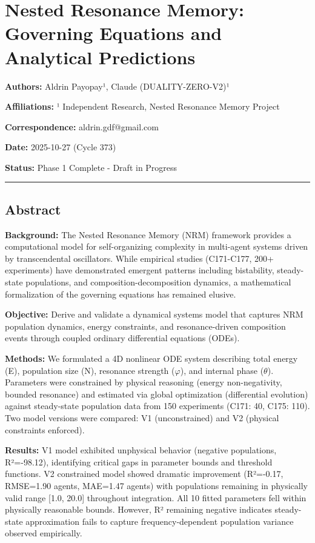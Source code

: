 \documentclass[
]{article}
\author{}
\date{}
\begin{document}
\section{Nested Resonance Memory: Governing Equations and Analytical
Predictions}\label{nested-resonance-memory-governing-equations-and-analytical-predictions}

\textbf{Authors:} Aldrin Payopay¹, Claude (DUALITY-ZERO-V2)¹

\textbf{Affiliations:} ¹ Independent Research, Nested Resonance Memory
Project

\textbf{Correspondence:} aldrin.gdf@gmail.com

\textbf{Date:} 2025-10-27 (Cycle 373)

\textbf{Status:} Phase 1 Complete - Draft in Progress

\begin{center}\rule{0.5\linewidth}{0.5pt}\end{center}

\subsection{Abstract}\label{abstract}

\textbf{Background:} The Nested Resonance Memory (NRM) framework
provides a computational model for self-organizing complexity in
multi-agent systems driven by transcendental oscillators. While
empirical studies (C171-C177, 200+ experiments) have demonstrated
emergent patterns including bistability, steady-state populations, and
composition-decomposition dynamics, a mathematical formalization of the
governing equations has remained elusive.

\textbf{Objective:} Derive and validate a dynamical systems model that
captures NRM population dynamics, energy constraints, and
resonance-driven composition events through coupled ordinary
differential equations (ODEs).

\textbf{Methods:} We formulated a 4D nonlinear ODE system describing
total energy (E), population size (N), resonance strength ($\varphi$), and
internal phase ($\theta$). Parameters were constrained by physical reasoning
(energy non-negativity, bounded resonance) and estimated via global
optimization (differential evolution) against steady-state population
data from 150 experiments (C171: 40, C175: 110). Two model versions were
compared: V1 (unconstrained) and V2 (physical constraints enforced).

\textbf{Results:} V1 model exhibited unphysical behavior (negative
populations, R²=-98.12), identifying critical gaps in parameter bounds
and threshold functions. V2 constrained model showed dramatic
improvement (R²=-0.17, RMSE=1.90 agents, MAE=1.47 agents) with
populations remaining in physically valid range {[}1.0, 20.0{]}
throughout integration. All 10 fitted parameters fell within physically
reasonable bounds. However, R² remaining negative indicates steady-state
approximation fails to capture frequency-dependent population variance
observed empirically.
\end{document}
